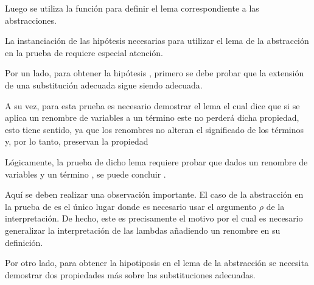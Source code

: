 
Luego se utiliza la función  para definir el lema correspondiente a las abstracciones.


La instanciación de las hipótesis necesarias para utilizar el lema de la abstracción en la prueba de  requiere especial atención.

Por un lado, para obtener la hipótesis \snstar {}, primero se debe probar que la extensión de una substitución adecuada sigue siendo adecuada.


A su vez, para esta prueba es necesario demostrar el lema  el cual dice que si se aplica un renombre de variables a un término \snstar este no perderá dicha propiedad, esto tiene sentido, ya que los renombres no alteran el significado de los términos y, por lo tanto, preservan la propiedad \snstar


Lógicamente, la prueba de dicho lema requiere probar que dados un renombre de variables \bound{$\rho$} y un término , se puede concluir .


Aquí se deben realizar una observación importante.
El caso de la abstracción en la prueba de  es el único lugar donde es necesario usar el argumento $\rho$ de la interpretación.
De hecho, este es precisamente el motivo por el cual es necesario generalizar la interpretación de las lambdas añadiendo un renombre en su definición.

\iffalse
En segundo lugar, en la prueba de \func{SN*-rename} se debe eliminar el renombre del paso de reducción para poder utilizar la hipótesis \bound{SNt}.
Para ello se define el siguiente lema:

\ExecuteMetaData[code/strong_norm_base.tex]{rename-reduction-type}

Básicamente, el lema dice que si una reducción parte de un término renombrado $t_\rho$, el resultado será un término $t'_\rho$, donde $t'$ se obtiene dando un paso de reducción desde $t$.
\fi

Por otro lado, para obtener la hipotiposis  en el lema de la abstracción se necesita demostrar dos propiedades más sobre las substituciones adecuadas.

